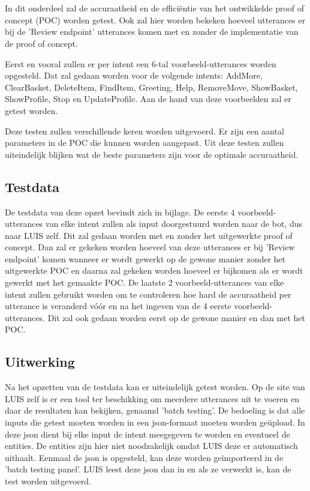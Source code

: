 \chapter{}
\label{ch:res}

In dit onderdeel zal de accuraatheid en de efficiëntie van het ontwikkelde proof of concept (POC) worden getest. Ook zal hier worden bekeken hoeveel utterances er bij de 'Review endpoint' utterances komen met en zonder de implementatie van de proof of concept.

Eerst en vooral zullen er per intent een 6-tal voorbeeld-utterances worden opgesteld. Dat zal gedaan worden voor de volgende intents: AddMore, ClearBasket, DeleteItem, FindItem, Greeting, Help, RemoveMove, ShowBasket, ShowProfile, Stop en UpdateProfile. Aan de hand van deze voorbeelden zal er getest worden.

Deze testen zullen verschillende keren worden uitgevoerd. Er zijn een aantal parameters in de POC die kunnen worden aangepast. Uit deze testen zullen uiteindelijk blijken wat de beste parameters zijn voor de optimale accuraatheid.

\section{Testdata}
\label{sec:testdata}

De testdata van deze opzet bevindt zich in bijlage. De eerste 4 voorbeeld-utterances van elke intent zullen als input doorgestuurd worden naar de bot, dus naar LUIS zelf. Dit zal gedaan worden met en zonder het uitgewerkte proof of concept. Dan zal er gekeken worden hoeveel van deze utterances er bij 'Review endpoint' komen wanneer er wordt gewerkt op de gewone manier zonder het uitgewerkte POC en daarna zal gekeken worden hoeveel er bijkomen als er wordt gewerkt met het gemaakte POC. De laatste 2 voorbeeld-utterances van elke intent zullen gebruikt worden om te controleren hoe hard de accuraatheid per utterance is veranderd vóór en na het ingeven van de 4 eerste voorbeeld-utterances. Dit zal ook gedaan worden eerst op de gewone manier en dan met het POC.

\section{Uitwerking}
\label{sec:uitwerking}

Na het opzetten van de testdata kan er uiteindelijk getest worden. Op de site van LUIS zelf is er een tool ter beschikking om meerdere utterances uit te voeren en daar de resultaten kan bekijken, genaamd 'batch testing'. De bedoeling is dat alle inputs die getest moeten worden in een json-formaat moeten worden geüpload. In deze json dient bij elke input de intent meegegeven te worden en eventueel de entities. De entities zijn hier niet noodzakelijk omdat LUIS deze er automatisch uithaalt. Eenmaal de json is opgesteld, kan deze worden geïmporteerd in de 'batch testing panel'. LUIS leest deze json dan in en als ze verwerkt is, kan de test worden uitgevoerd.


